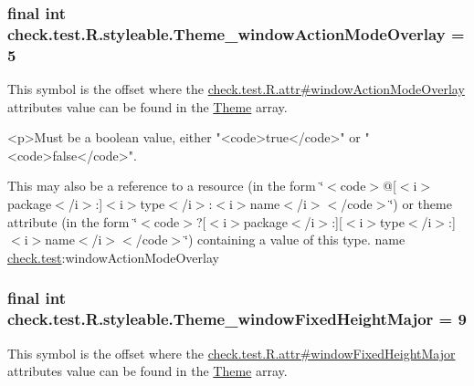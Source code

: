 \subsubsection[{Theme\+\_\+window\+Action\+Mode\+Overlay}]{\setlength{\rightskip}{0pt plus 5cm}final int check.\+test.\+R.\+styleable.\+Theme\+\_\+window\+Action\+Mode\+Overlay = 5\hspace{0.3cm}{\ttfamily [static]}}\label{classcheck_1_1test_1_1_r_1_1styleable_a5abe584f47941f3243c037bca83f20fd}
This symbol is the offset where the \hyperlink{classcheck_1_1test_1_1_r_1_1attr_a29b4d3e415a1c7f9c6528fc82443932a}{check.\+test.\+R.\+attr\#window\+Action\+Mode\+Overlay} attribute\textquotesingle{}s value can be found in the \hyperlink{classcheck_1_1test_1_1_r_1_1styleable_acca726d02016a0cf607782ec3a436a81}{Theme} array.

\begin{DoxyVerb}      <p>Must be a boolean value, either "<code>true</code>" or "<code>false</code>".
\end{DoxyVerb}
 

This may also be a reference to a resource (in the form \char`\"{}$<$code$>$@\mbox{[}$<$i$>$package$<$/i$>$\+:\mbox{]}$<$i$>$type$<$/i$>$\+:$<$i$>$name$<$/i$>$$<$/code$>$\char`\"{}) or theme attribute (in the form \char`\"{}$<$code$>$?\mbox{[}$<$i$>$package$<$/i$>$\+:\mbox{]}\mbox{[}$<$i$>$type$<$/i$>$\+:\mbox{]}$<$i$>$name$<$/i$>$$<$/code$>$\char`\"{}) containing a value of this type.  name \hyperlink{namespacecheck_1_1test}{check.\+test}\+:window\+Action\+Mode\+Overlay \hypertarget{classcheck_1_1test_1_1_r_1_1styleable_a9e8a42067e25b6c873f7293e9bee1343}{}
\subsubsection[{Theme\+\_\+window\+Fixed\+Height\+Major}]{\setlength{\rightskip}{0pt plus 5cm}final int check.\+test.\+R.\+styleable.\+Theme\+\_\+window\+Fixed\+Height\+Major = 9\hspace{0.3cm}{\ttfamily [static]}}\label{classcheck_1_1test_1_1_r_1_1styleable_a9e8a42067e25b6c873f7293e9bee1343}
This symbol is the offset where the \hyperlink{classcheck_1_1test_1_1_r_1_1attr_a117326070fd6496640c70afd9d2eef7a}{check.\+test.\+R.\+attr\#window\+Fixed\+Height\+Major} attribute\textquotesingle{}s value can be found in the \hyperlink{classcheck_1_1test_1_1_r_1_1styleable_acca726d02016a0cf607782ec3a436a81}{Theme} array.

